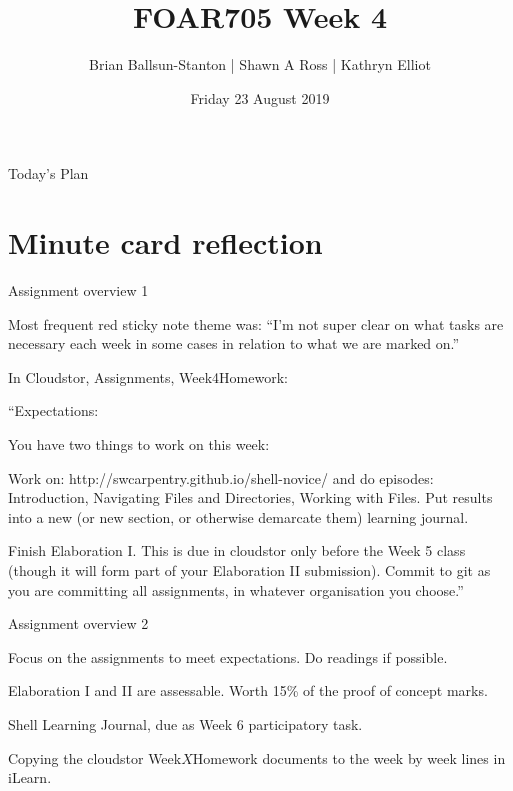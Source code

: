 \documentclass[aspectratio=1610, 11pt]{beamer} %
\title{FOAR705 Week 4} %
\author{Brian Ballsun-Stanton | Shawn A Ross | Kathryn Elliot}               %
\institute{Faculty of Arts}         %
\date{Friday 23 August 2019}                 %
\begin{document}

\maketitle

  

\begin{frame}{Today's Plan}
  \tableofcontents
\end{frame}

\section{Minute card reflection}
\begin{frame}{Assignment overview 1}

Most frequent red sticky note theme was: ``I'm not super clear on what tasks are necessary each week in some cases in relation to what we are marked on.'' 

In Cloudstor, Assignments, Week4Homework:

``Expectations:

You have two things to work on this week:

Work on: http://swcarpentry.github.io/shell-novice/ and do episodes: Introduction, Navigating Files and Directories, Working with Files. Put results into a new (or new section, or otherwise demarcate them) learning journal.

Finish Elaboration I. This is due in cloudstor only before the Week 5 class (though it will form part of your Elaboration II submission). Commit to git as you are committing all assignments, in whatever organisation you choose.''

\end{frame}
\begin{frame}{Assignment overview 2}

Focus on the assignments to meet expectations. Do readings if possible. 

Elaboration I and II are assessable. Worth 15\% of the proof of concept marks. 

Shell Learning Journal, due as Week 6 participatory task.

Copying the cloudstor Week$X$Homework documents to the week by week lines in iLearn. 

\end{frame}
\end{document}

